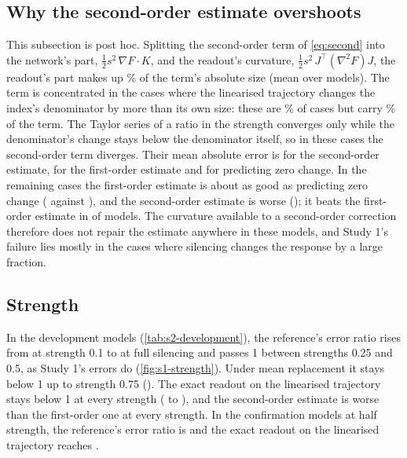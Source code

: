 \subsection{Why the second-order estimate overshoots}
\label{sec:second}

This subsection is post hoc. Splitting the second-order term of \cref{eq:second} into the network's part, $\tfrac12 s^2\,\nabla F\cdot K$, and the readout's curvature, $\tfrac12 s^2\,J^{\top}(\nabla^2F)J$, the readout's part makes up \PostShareReadout\% of the term's absolute size (mean over models). The term is concentrated in the cases where the linearised trajectory changes the index's denominator by more than its own size: these are \PostLargeDenFrac\% of cases but carry \PostLargeDenShare\% of the term. The Taylor series of a ratio in the strength converges only while the denominator's change stays below the denominator itself, so in these cases the second-order term diverges. Their mean absolute error is \PostLargeSecond{} for the second-order estimate, \PostLargeFirst{} for the first-order estimate and \PostLargeZero{} for predicting zero change. In the remaining cases the first-order estimate is about as good as predicting zero change (\PostRestFirst{} against \PostRestZero{}), and the second-order estimate is worse (\PostRestSecond{}); it beats the first-order estimate in \PostRestSecondBelowFirst{} of \NConfModels{} models. The curvature available to a second-order correction therefore does not repair the estimate anywhere in these models, and Study 1's failure lies mostly in the cases where silencing changes the response by a large fraction.

\subsection{Strength}
\label{sec:s2-strength}

In the development models (\cref{tab:s2-development}), the reference's error ratio rises from \DevRefPointOne{} at strength 0.1 to \DevRefFull{} at full silencing and passes 1 between strengths 0.25 and 0.5, as Study 1's errors do (\cref{fig:s1-strength}). Under mean replacement it stays below 1 up to strength 0.75 (\DevAThreeQ{}). The exact readout on the linearised trajectory stays below 1 at every strength (\DevCfReadPointOne{} to \DevCfReadFull{}), and the second-order estimate is worse than the first-order one at every strength. In the confirmation models at half strength, the reference's error ratio is \RatioRefHalf{} \RatioCIRefHalf{} and the exact readout on the linearised trajectory reaches \RatioCfReadHalf{} \RatioCICfReadHalf{}.

